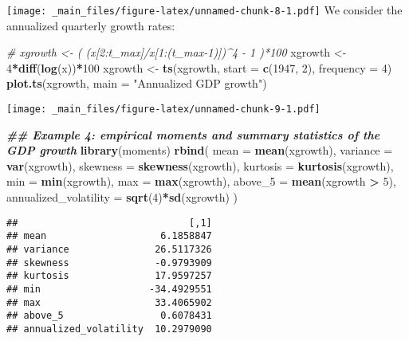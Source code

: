 \documentclass[
]{book}
\newenvironment{Shaded}{\begin{snugshade}}{\end{snugshade}}
\newcommand{\AttributeTok}[1]{\textcolor[rgb]{0.13,0.29,0.53}{#1}}
\newcommand{\CommentTok}[1]{\textcolor[rgb]{0.56,0.35,0.01}{\textit{#1}}}
\newcommand{\DecValTok}[1]{\textcolor[rgb]{0.00,0.00,0.81}{#1}}
\newcommand{\DocumentationTok}[1]{\textcolor[rgb]{0.56,0.35,0.01}{\textbf{\textit{#1}}}}
\newcommand{\FunctionTok}[1]{\textcolor[rgb]{0.13,0.29,0.53}{\textbf{#1}}}
\newcommand{\NormalTok}[1]{#1}
\newcommand{\OtherTok}[1]{\textcolor[rgb]{0.56,0.35,0.01}{#1}}
\newcommand{\SpecialCharTok}[1]{\textcolor[rgb]{0.81,0.36,0.00}{\textbf{#1}}}
\newcommand{\StringTok}[1]{\textcolor[rgb]{0.31,0.60,0.02}{#1}}
\begin{document}
\texttt{[image: \_main\_files/figure-latex/unnamed-chunk-8-1.pdf]}
We consider the annualized quarterly growth rates:

\begin{Shaded}
\begin{Highlighting}[]
\CommentTok{\# xgrowth \textless{}{-} ( (x[2:t\_max]/x[1:(t\_max{-}1)])\^{}4 {-} 1 )*100}
\NormalTok{xgrowth }\OtherTok{\textless{}{-}} \DecValTok{4}\SpecialCharTok{*}\FunctionTok{diff}\NormalTok{(}\FunctionTok{log}\NormalTok{(x))}\SpecialCharTok{*}\DecValTok{100}
\NormalTok{xgrowth }\OtherTok{\textless{}{-}} \FunctionTok{ts}\NormalTok{(xgrowth, }\AttributeTok{start =} \FunctionTok{c}\NormalTok{(}\DecValTok{1947}\NormalTok{, }\DecValTok{2}\NormalTok{), }\AttributeTok{frequency =} \DecValTok{4}\NormalTok{)}
\FunctionTok{plot.ts}\NormalTok{(xgrowth, }\AttributeTok{main =} \StringTok{"Annualized GDP growth"}\NormalTok{)}
\end{Highlighting}
\end{Shaded}

\texttt{[image: \_main\_files/figure-latex/unnamed-chunk-9-1.pdf]}

\begin{Shaded}
\begin{Highlighting}[]
\DocumentationTok{\#\# Example 4: empirical moments and summary statistics of the GDP growth}
\FunctionTok{library}\NormalTok{(moments)}
\FunctionTok{rbind}\NormalTok{(}
  \AttributeTok{mean     =} \FunctionTok{mean}\NormalTok{(xgrowth),}
  \AttributeTok{variance =} \FunctionTok{var}\NormalTok{(xgrowth),}
  \AttributeTok{skewness =} \FunctionTok{skewness}\NormalTok{(xgrowth),}
  \AttributeTok{kurtosis =} \FunctionTok{kurtosis}\NormalTok{(xgrowth),}
  \AttributeTok{min      =} \FunctionTok{min}\NormalTok{(xgrowth),}
  \AttributeTok{max      =} \FunctionTok{max}\NormalTok{(xgrowth),}
  \AttributeTok{above\_5  =} \FunctionTok{mean}\NormalTok{(xgrowth }\SpecialCharTok{\textgreater{}} \DecValTok{5}\NormalTok{),}
  \AttributeTok{annualized\_volatility =} \FunctionTok{sqrt}\NormalTok{(}\DecValTok{4}\NormalTok{)}\SpecialCharTok{*}\FunctionTok{sd}\NormalTok{(xgrowth)}
\NormalTok{)}
\end{Highlighting}
\end{Shaded}

\begin{verbatim}
##                              [,1]
## mean                    6.1858847
## variance               26.5117326
## skewness               -0.9793909
## kurtosis               17.9597257
## min                   -34.4929551
## max                    33.4065902
## above_5                 0.6078431
## annualized_volatility  10.2979090
\end{verbatim}
\end{document}
